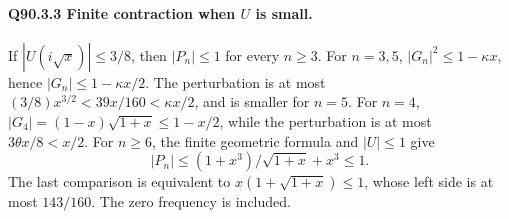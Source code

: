 \paragraph{Q90.3.3 Finite contraction when \(U\) is small.}
If \(|U(i\sqrt x)|\le\allowbreak 3/8\), then \(|P_n|\le\allowbreak 1\) for every \(n\ge\allowbreak 3\).
For \(n=\allowbreak 3,\allowbreak 5\), \(|G_n|^2\le\allowbreak 1-\kappa x\), hence
\(|G_n|\le\allowbreak 1-\kappa x/2\). The perturbation is at most
\((3/8)x^{3/2}<\allowbreak 39x/160<\allowbreak \kappa x/2\), and is smaller for \(n=\allowbreak 5\).
For \(n=\allowbreak 4\), \(|G_4|=\allowbreak (1-x)\sqrt{1+x}\le\allowbreak 1-x/2\), while the
perturbation is at most \(3\theta x/8<\allowbreak x/2\).
For \(n\ge\allowbreak 6\), the finite geometric formula and \(|U|\le\allowbreak 1\) give
\begin{equation}\tag{Q90.3.11}\label{eq:Q90:3.11}
|P_n|\le(1+x^3)/\sqrt{1+x}+x^3\le1.
\end{equation}
The last comparison is equivalent to
\(x(1+\sqrt{1+x})\le\allowbreak 1\), whose left side is at most \(143/160\).
The zero frequency is included.

